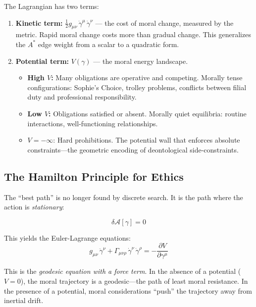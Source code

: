 \documentclass[12pt]{article}
\theoremstyle{definition}
\theoremstyle{remark}
\newcommand{\Act}{\mathcal{A}}
\begin{document}
The Lagrangian has two terms:

\begin{enumerate}
    \item \textbf{Kinetic term:} $\frac{1}{2} g_{\mu\nu}\, \dot{\gamma}^\mu\, \dot{\gamma}^\nu$ --- the cost of moral change, measured by the metric. Rapid moral change costs more than gradual change. This generalizes the $A^*$ edge weight from a scalar to a quadratic form.

    \item \textbf{Potential term:} $V(\gamma)$ --- the moral energy landscape.
    \begin{itemize}
        \item \textbf{High $V$:} Many obligations are operative and competing. Morally tense configurations: Sophie's Choice, trolley problems, conflicts between filial duty and professional responsibility.
        \item \textbf{Low $V$:} Obligations satisfied or absent. Morally quiet equilibria: routine interactions, well-functioning relationships.
        \item $V = -\infty$: Hard prohibitions. The potential wall that enforces absolute constraints---the geometric encoding of deontological side-constraints.
    \end{itemize}
\end{enumerate}

\subsection{The Hamilton Principle for Ethics}

The ``best path'' is no longer found by discrete search. It is the path where the action is \emph{stationary}:

\begin{equation}
\delta \Act[\gamma] = 0
\end{equation}

This yields the Euler-Lagrange equations:
\begin{equation}\label{eq:euler-lagrange}
g_{\mu\nu}\, \ddot{\gamma}^\nu + \Gamma_{\mu\nu\rho}\, \dot{\gamma}^\nu\, \dot{\gamma}^\rho = -\frac{\partial V}{\partial \gamma^\mu}
\end{equation}

This is the \emph{geodesic equation with a force term}. In the absence of a potential ($V = 0$), the moral trajectory is a geodesic---the path of least moral resistance. In the presence of a potential, moral considerations ``push'' the trajectory away from inertial drift.
\end{document}

